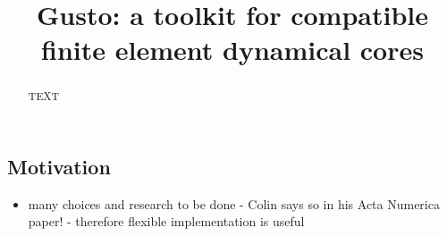 \documentclass[journal abbreviation, manuscript]{copernicus}
\begin{document}
\title{Gusto: a toolkit for compatible finite element dynamical cores}















\received{}
\pubdiscuss{} %
\revised{}
\accepted{}
\published{}




\maketitle



\begin{abstract}
TEXT
\end{abstract}



\introduction   %

\subsection{Motivation}
\begin{itemize}
\item many choices and research to be done - Colin says so in his Acta Numerica paper! - therefore flexible implementation is useful
\end{itemize}
\end{document}
